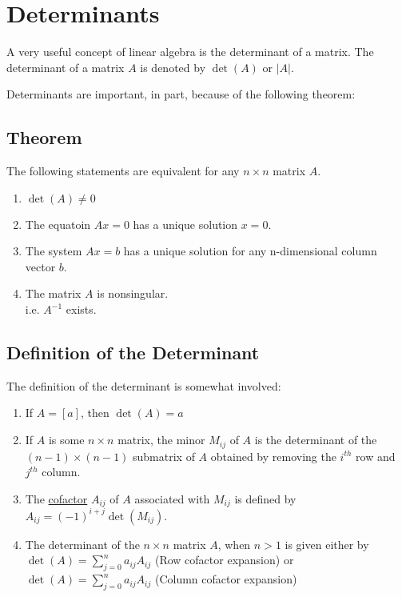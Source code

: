 \documentclass[12pt]{article}
\begin{document}
\section{Determinants}

A very useful concept of linear algebra is the determinant of a matrix. The
determinant of a matrix $A$ is denoted by $\det(A)$ or $|A|$.

Determinants are important, in part, because of the following theorem:

\subsection{Theorem}

The following statements are equivalent for any $n \times n$ matrix $A$.

\begin{enumerate}
  \item $\det(A) \neq 0$
  \item The equatoin $Ax = 0$ has a unique solution $x=0$.
  \item The system $Ax=b$ has a unique solution for any n-dimensional column
    vector $b$.
  \item The matrix $A$ is nonsingular.\\
    i.e. $A^{-1}$ exists.
\end{enumerate}

\subsection{Definition of the Determinant}

The definition of the determinant is somewhat involved:

\begin{enumerate}[label=(\alph*)]
  \item If $A=[a]$, then $\det(A) = a$
  \item If $A$ is some $n \times n$ matrix, the minor $M_{ij}$ of $A$ is the
    determinant of the $(n-1) \times (n-1)$ submatrix of $A$ obtained by 
    removing the $i^{th}$ row and $j^{th}$ column.
  \item The \uline{cofactor} $A_{ij}$ of $A$ associated with $M_{ij}$ is defined
    by $A_{ij} = (-1)^{i+j} \det(M_{ij})$.
  \item The determinant of the $n \times n$ matrix $A$, when $n>1$ is given
    either by 
    \subitem $\det(A) = \sum_{j = 0}^{n} {a_{ij} A_{ij}}$ (Row cofactor expansion) or
    \subitem $\det(A) = \sum_{j = 0}^{n} {a_{ij} A_{ij}}$ (Column cofactor expansion)
\end{enumerate}
\end{document}
